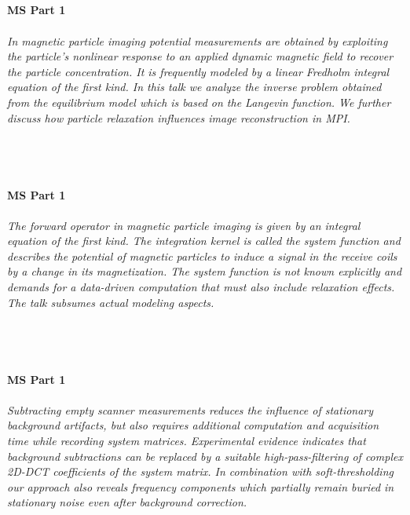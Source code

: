 \begin{multicols}{2}
\\ 
    \\
    \\\\
    \noindent\textbf{MS Part 1}\\
\\  
    \textit{In magnetic particle imaging potential measurements are obtained by exploiting the particle’s nonlinear response to an applied dynamic magnetic field to recover the particle concentration. It is frequently modeled by a linear Fredholm integral equation of the first kind. In this talk we analyze the inverse problem obtained from the equilibrium model which is based on the Langevin function. We further discuss how particle relaxation influences image reconstruction in MPI.}\\
\\ 
    \\
    \\\\
    \noindent\textbf{MS Part 1}\\
\\  
    \textit{The forward operator in magnetic particle imaging is given by an integral equation of the first kind. The integration kernel is called the system function and describes the potential of magnetic particles to induce a signal in the receive coils by a change in its magnetization. The system function is not known explicitly and demands for a data-driven computation that must also include relaxation effects. The talk subsumes actual modeling aspects.}\\
\\ 
    \\
    \\\\
    \noindent\textbf{MS Part 1}\\
\\  
    \textit{Subtracting empty scanner measurements reduces the influence of stationary background artifacts, but also requires additional computation and acquisition time while recording system matrices. 
Experimental evidence indicates that background subtractions can be replaced by a suitable high-pass-filtering of complex 2D-DCT coefficients of the system matrix. 
In combination with soft-thresholding our approach also reveals frequency components which partially remain buried in stationary noise even after background correction.  
}
\end{multicols}
